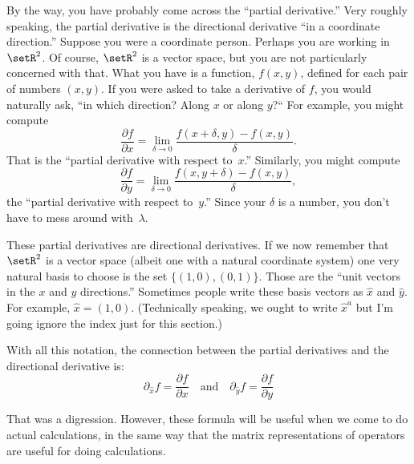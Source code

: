 \documentclass[10pt, a4paper]{article}
\begin{document}
By the way, you have probably come across the “partial derivative.”
Very roughly speaking, the partial derivative is the directional
derivative “in a coordinate direction.” Suppose you were a coordinate
person. Perhaps you are working in $\setR^2$. Of course, $\setR^2$ is
a vector space, but you are not particularly concerned with that. What
you have is a function, $f(x,y)$, defined for each pair of numbers
$(x,y)$. If you were asked to take a derivative of $f$, you would
naturally ask, “in which direction? Along $x$ or along $y$?“ For
example, you might compute
\begin{equation*}
  \frac{\partial f}{\partial x} = \lim_{\delta\to 0} \frac{f(x + \delta, y) - f(x, y)}{\delta}.
\end{equation*}
That is the “partial derivative with respect to~$x$.” Similarly, you
might compute
\begin{equation*}
  \frac{\partial f}{\partial y} = \lim_{\delta\to 0} \frac{f(x, y+\delta) - f(x, y)}{\delta},
\end{equation*}
the “partial derivative with respect to~$y$.” Since your $\delta$ is a
number, you don't have to mess around with~$\lambda$.

These partial derivatives are directional derivatives. If we now
remember that $\setR^2$ is a vector space (albeit one with a natural
coordinate system) one very natural basis to choose is the set
$\{(1,0), (0,1)\}$. Those are the “unit vectors in the $x$ and $y$
directions.” Sometimes people write these basis vectors as $\hat{x}$
and $\hat{y}$. For example, $\hat{x} = (1,0)$. (Technically speaking,
we ought to write $\hat{x}^a$ but I'm going ignore the index just for
this section.)

With all this notation, the connection between the partial derivatives
and the directional derivative is:
\begin{equation*}
  \partial_{\hat{x}}f = \frac{\partial f}{\partial x} \quad\text{and}\quad 
  \partial_{\hat{y}}f = \frac{\partial f}{\partial y} 
\end{equation*}

That was a digression. However, these formula will be useful when we
come to do actual calculations, in the same way that the matrix
representations of operators are useful for doing calculations.
\end{document}
